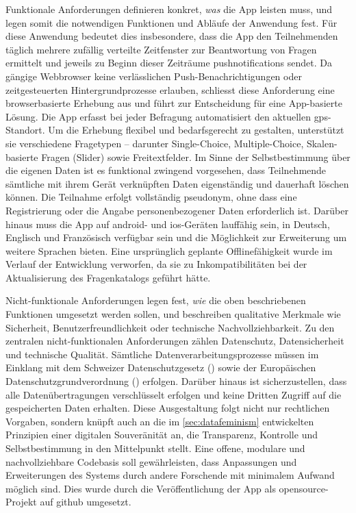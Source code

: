 Funktionale Anforderungen definieren konkret, \textit{was} die App leisten muss, und legen somit die notwendigen Funktionen und Abläufe der Anwendung fest. Für diese Anwendung bedeutet dies insbesondere, dass die App den Teilnehmenden täglich mehrere zufällig verteilte Zeitfenster zur Beantwortung von Fragen ermittelt und jeweils zu Beginn dieser Zeiträume \glspl{pushnotification} sendet. Da gängige Webbrowser keine verlässlichen Push-Benachrichtigungen oder zeitgesteuerten Hintergrundprozesse erlauben, schliesst diese Anforderung eine browserbasierte Erhebung aus und führt zur Entscheidung für eine App-basierte Lösung. Die App erfasst bei jeder Befragung automatisiert den aktuellen \gls{gps}-Standort. Um die Erhebung flexibel und bedarfsgerecht zu gestalten, unterstützt sie verschiedene Fragetypen -- darunter Single-Choice, Multiple-Choice, Skalen-basierte Fragen (Slider) sowie Freitextfelder. Im Sinne der Selbstbestimmung über die eigenen Daten ist es funktional zwingend vorgesehen, dass Teilnehmende sämtliche mit ihrem Gerät verknüpften Daten eigenständig und dauerhaft löschen können. Die Teilnahme erfolgt vollständig pseudonym, ohne dass eine Registrierung oder die Angabe personenbezogener Daten erforderlich ist. Darüber hinaus muss die App auf \gls{android}- und \gls{ios}-Geräten lauffähig sein, in Deutsch, Englisch und Französisch verfügbar sein und die Möglichkeit zur Erweiterung um weitere Sprachen bieten. Eine ursprünglich geplante Offlinefähigkeit wurde im Verlauf der Entwicklung verworfen, da sie zu Inkompatibilitäten bei der Aktualisierung des Fragenkatalogs geführt hätte.

Nicht-funktionale Anforderungen legen fest, \textit{wie} die oben beschriebenen Funktionen umgesetzt werden sollen, und beschreiben qualitative Merkmale wie Sicherheit, Benutzerfreundlichkeit oder technische Nachvollziehbarkeit. Zu den zentralen nicht-funktionalen Anforderungen zählen Datenschutz, Datensicherheit und technische Qualität. Sämtliche Datenverarbeitungsprozesse müssen im Einklang mit dem Schweizer Datenschutzgesetz () sowie der Europäischen Datenschutzgrundverordnung () erfolgen. Darüber hinaus ist sicherzustellen, dass alle Datenübertragungen verschlüsselt erfolgen und keine Dritten Zugriff auf die gespeicherten Daten erhalten. Diese Ausgestaltung folgt nicht nur rechtlichen Vorgaben, sondern knüpft auch an die im \cref{sec:datafeminism} entwickelten Prinzipien einer digitalen Souveränität an, die Transparenz, Kontrolle und Selbstbestimmung in den Mittelpunkt stellt. Eine offene, modulare und nachvollziehbare Codebasis soll gewährleisten, dass Anpassungen und Erweiterungen des Systems durch andere Forschende mit minimalem Aufwand möglich sind. Dies wurde durch die Veröffentlichung der App als \gls{opensource}-Projekt auf \gls{github} umgesetzt.

